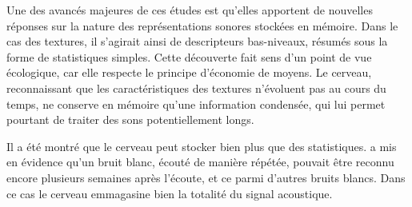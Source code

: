 Une des avancés majeures de ces études est qu'elles apportent de nouvelles réponses sur la nature des représentations sonores stockées en mémoire. Dans le cas des textures, il s'agirait ainsi de descripteurs bas-niveaux, résumés sous la forme de statistiques simples. Cette découverte fait sens d'un point de vue écologique, car elle respecte le principe d'économie de moyens. Le cerveau, reconnaissant que les caractéristiques des textures n'évoluent pas au cours du temps, ne conserve en mémoire qu'une information condensée, qui lui permet pourtant de traiter des sons potentiellement longs. 

Il a été montré que le cerveau peut stocker bien plus que des statistiques. \citep{agus2010rapid} a mis en évidence qu'un bruit blanc, écouté de manière répétée, pouvait être reconnu encore plusieurs semaines après l'écoute, et ce parmi d'autres bruits blancs. Dans ce cas le cerveau emmagasine bien la totalité du signal acoustique.




